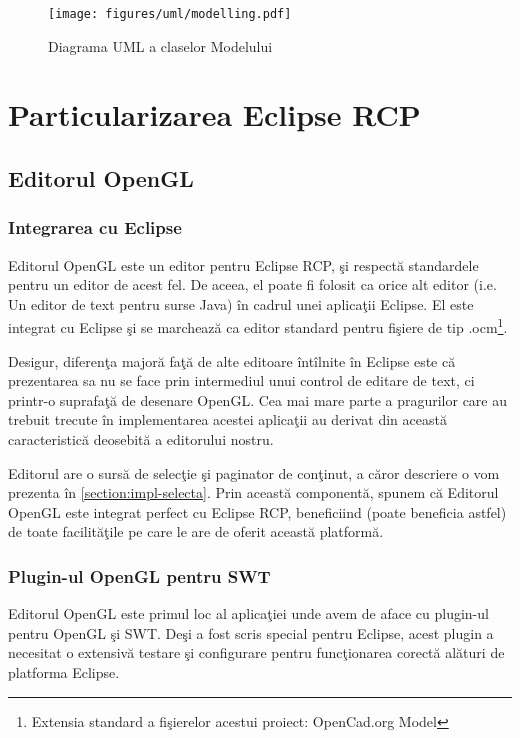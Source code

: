 \begin{figure}[htp]
\begin{center}
  \texttt{[image: figures/uml/modelling.pdf]}
  \caption{Diagrama UML a claselor Modelului}
  \label{figure:uml-model}
\end{center}
\end{figure}

\section{Particularizarea Eclipse RCP}

\subsection{Editorul OpenGL}
\label{section:impl-editor}

\subsubsection{Integrarea cu Eclipse}
Editorul OpenGL este un editor pentru Eclipse RCP, şi respectă standardele
pentru un editor de acest fel. De aceea, el poate fi folosit ca orice alt editor
(i.e. Un editor de text pentru surse Java) în cadrul unei aplicaţii Eclipse. El
este integrat cu Eclipse şi se marchează ca editor standard pentru fişiere de
tip .ocm\footnote{Extensia standard a fişierelor acestui proiect: OpenCad.org
Model}.

Desigur, diferenţa majoră faţă de alte editoare întîlnite în Eclipse este că
prezentarea sa nu se face prin intermediul unui control de editare de text, ci
printr-o suprafaţă de desenare OpenGL. Cea mai mare parte a pragurilor care au
trebuit trecute în implementarea acestei aplicaţii au derivat din această
caracteristică deosebită a editorului nostru.

Editorul are o sursă de selecţie şi paginator de conţinut, a căror descriere o
vom prezenta în \ref{section:impl-selecta}. Prin această componentă, spunem că
Editorul OpenGL este integrat perfect cu Eclipse RCP, beneficiind (poate
beneficia astfel) de toate facilităţile pe care le are de oferit această
platformă.

\subsubsection{Plugin-ul OpenGL pentru SWT}
Editorul OpenGL este primul loc al aplicaţiei unde avem de aface cu plugin-ul
pentru OpenGL şi SWT. Deşi a fost scris special pentru Eclipse, acest plugin a
necesitat o extensivă testare şi configurare pentru funcţionarea corectă alături
de platforma Eclipse.


